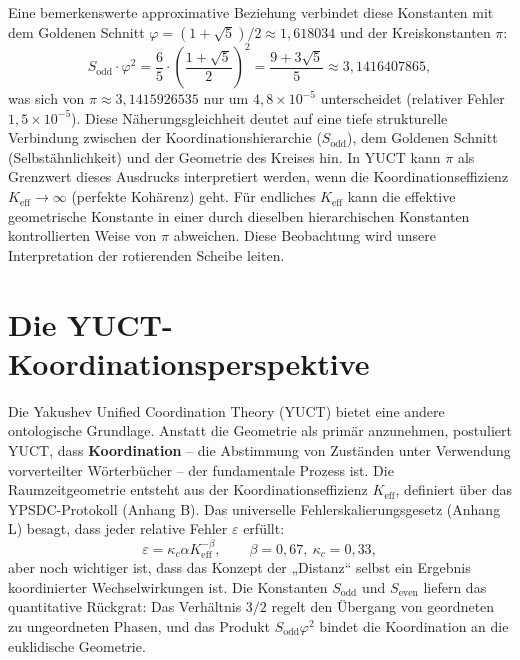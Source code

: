 \documentclass[12pt,a4paper]{article}
\newcommand{\kappac}{\kappa_c}
\newcommand{\eps}{\varepsilon}
\newcommand{\betaf}{\beta}
\newcommand{\Sodd}{S_{\mathrm{odd}}}
\newcommand{\Seven}{S_{\mathrm{even}}}
\begin{document}
	Eine bemerkenswerte approximative Beziehung verbindet diese Konstanten mit dem Goldenen Schnitt \(\varphi = (1+\sqrt{5})/2 \approx 1,618034\) und der Kreiskonstanten \(\pi\):
	\begin{equation}
		\Sodd \cdot \varphi^2 = \frac{6}{5} \cdot \left(\frac{1+\sqrt{5}}{2}\right)^2 = \frac{9+3\sqrt{5}}{5} \approx 3,1416407865,
	\end{equation}
	was sich von \(\pi \approx 3,1415926535\) nur um \(4,8\times10^{-5}\) unterscheidet (relativer Fehler \(1,5\times10^{-5}\)). Diese Näherungsgleichheit deutet auf eine tiefe strukturelle Verbindung zwischen der Koordinationshierarchie (\(\Sodd\)), dem Goldenen Schnitt (Selbstähnlichkeit) und der Geometrie des Kreises hin. In YUCT kann \(\pi\) als Grenzwert dieses Ausdrucks interpretiert werden, wenn die Koordinationseffizienz \(K_{\mathrm{eff}} \to \infty\) (perfekte Kohärenz) geht. Für endliches \(K_{\mathrm{eff}}\) kann die effektive geometrische Konstante in einer durch dieselben hierarchischen Konstanten kontrollierten Weise von \(\pi\) abweichen. Diese Beobachtung wird unsere Interpretation der rotierenden Scheibe leiten.
	
	\section{Die YUCT-Koordinationsperspektive}
	\label{sec:yuct}
	
	Die Yakushev Unified Coordination Theory (YUCT) bietet eine andere ontologische Grundlage. Anstatt die Geometrie als primär anzunehmen, postuliert YUCT, dass \textbf{Koordination} – die Abstimmung von Zuständen unter Verwendung vorverteilter Wörterbücher – der fundamentale Prozess ist. Die Raumzeitgeometrie entsteht aus der Koordinationseffizienz \(K_{\mathrm{eff}}\), definiert über das YPSDC-Protokoll (Anhang B). Das universelle Fehlerskalierungsgesetz (Anhang L) besagt, dass jeder relative Fehler \(\eps\) erfüllt:
	\[
	\eps = \kappac \alpha K_{\mathrm{eff}}^{-\betaf}, \qquad \betaf = 0,67,\ \kappac = 0,33,
	\]
	aber noch wichtiger ist, dass das Konzept der „Distanz“ selbst ein Ergebnis koordinierter Wechselwirkungen ist. Die Konstanten \(\Sodd\) und \(\Seven\) liefern das quantitative Rückgrat: Das Verhältnis \(3/2\) regelt den Übergang von geordneten zu ungeordneten Phasen, und das Produkt \(\Sodd\varphi^2\) bindet die Koordination an die euklidische Geometrie.
	
\end{document}
